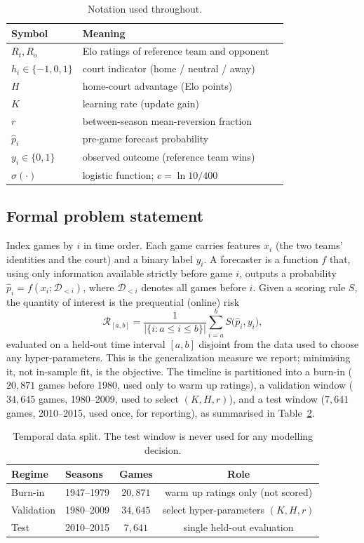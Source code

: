 \documentclass[11pt]{article}
\begin{document}
\begin{table}[h]
\centering
\begin{tabular}{lll}
\toprule
Symbol & Meaning & \\
\midrule
$R_t, R_o$ & Elo ratings of reference team and opponent & \\
$h_i \in \{-1,0,1\}$ & court indicator (home / neutral / away) & \\
$H$ & home-court advantage (Elo points) & \\
$K$ & learning rate (update gain) & \\
$r$ & between-season mean-reversion fraction & \\
$\hat p_i$ & pre-game forecast probability & \\
$y_i \in \{0,1\}$ & observed outcome (reference team wins) & \\
$\sigma(\cdot)$ & logistic function; $c=\ln 10/400$ & \\
\bottomrule
\end{tabular}
\caption{Notation used throughout.}
\label{tab:notation}
\end{table}

\subsection{Formal problem statement}
Index games by $i$ in time order. Each game carries features $x_i$ (the two teams'
identities and the court) and a binary label $y_i$. A forecaster is a function
$f$ that, using only information available strictly before game $i$, outputs a
probability $\hat p_i = f(x_i; \mathcal D_{<i})$, where $\mathcal D_{<i}$ denotes
all games before $i$. Given a scoring rule $S$, the quantity of interest is the
prequential (online) risk
\[
\mathcal R_{[a,b]} = \frac{1}{|\{i: a \le i \le b\}|}\sum_{i=a}^{b}
S\big(\hat p_i, y_i\big),
\]
evaluated on a held-out time interval $[a,b]$ disjoint from the data used to choose
any hyper-parameters. This is the generalization measure we report; minimising it,
not in-sample fit, is the objective. The timeline is partitioned into a burn-in
($20{,}871$ games before 1980, used only to warm up ratings), a validation window
($34{,}645$ games, 1980--2009, used to select $(K,H,r)$), and a test window
($7{,}641$ games, 2010--2015, used once, for reporting), as summarised in
Table~\ref{tab:split}.

\begin{table}[h]
\centering
\begin{tabular}{llcc}
\toprule
Regime & Seasons & Games & Role \\
\midrule
Burn-in & 1947--1979 & $20{,}871$ & warm up ratings only (not scored) \\
Validation & 1980--2009 & $34{,}645$ & select hyper-parameters $(K,H,r)$ \\
Test & 2010--2015 & $7{,}641$ & single held-out evaluation \\
\bottomrule
\end{tabular}
\caption{Temporal data split. The test window is never used for any modelling
decision.}
\label{tab:split}
\end{table}
\end{document}
